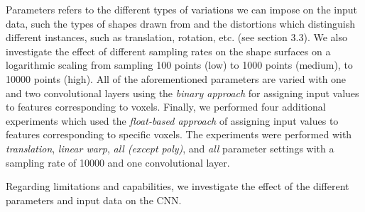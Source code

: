 \documentclass{article}
\begin{document}
Parameters refers to the different types of variations we can impose on the input data,
such the types of shapes drawn from and the
distortions which distinguish different instances, such as translation,
rotation, etc. (see section 3.3). We also investigate the effect of different sampling rates on the shape surfaces on a logarithmic scaling from sampling 100 points (low) to 1000 points (medium), to 10000 points (high). All of the aforementioned parameters are varied with one and two convolutional layers using the \textit{binary approach} for assigning input values to features corresponding to voxels. Finally, we performed four additional experiments which used the \textit{float-based approach} of assigning input values to features corresponding to specific voxels. The experiments were performed with \textit{translation}, \textit{linear warp}, \textit{all (except poly)}, and \textit{all} parameter settings with a sampling rate of 10000 and one convolutional layer.

Regarding limitations and capabilities, we investigate the effect of the different parameters and input data on the CNN.
\end{document}
